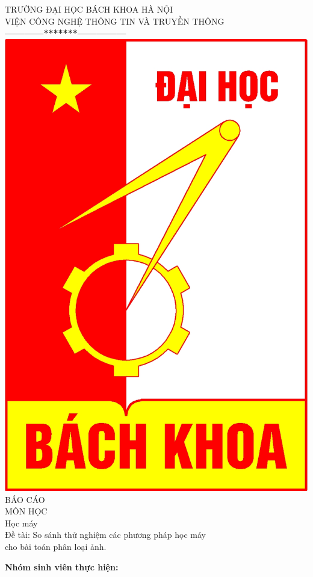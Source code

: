 \documentclass[a4paper,12pt]{report}
\begin{document}
\thispagestyle{empty}
\thisfancypage{
\setlength{\fboxrule}{1pt}
\doublebox}{}
\begin{center}
{\fontsize{16}{19}\selectfont TRƯỜNG ĐẠI HỌC BÁCH KHOA HÀ NỘI\\
VIỆN CÔNG NGHỆ THÔNG TIN VÀ TRUYỀN THÔNG}\\
\textbf{------------*******---------------}\\[1cm]
\includegraphics[scale=0.13]{hust.jpg}\\[1.3cm]

{\fontsize{32}{43}\selectfont BÁO CÁO}\\[0.1cm]
{\fontsize{38}{45}\selectfont MÔN HỌC}\\[0.2cm]
{\fontsize{19}{20}\selectfont Học máy }\\[0.2cm]
{\fontsize{13}{20}\selectfont Đề tài: So sánh thử nghiệm các phương pháp học máy\\ cho bài toán phân loại ảnh.
}\\[2.5cm]
\end{center}
\hspace{1cm}\fontsize{14}{16}\selectfont \textbf{Nhóm sinh viên thực hiện:}
\end{document}
